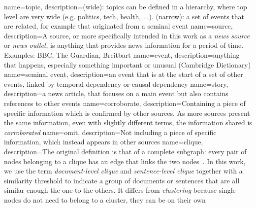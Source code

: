 {
        name=topic,
        description={(wide): topics can be defined in a hierarchy, where top level are very wide (e.g. politics, tech, health, ...).
        (narrow): a set of events that are related, for example that originated from a seminal event}
}
{
        name=source,
        description={A source, or more specifically intended in this work as a \emph{news source} or \emph{news outlet}, is anything that provides news information for a period of time. Examples: BBC, The Guardian, Breitbart}
}
{
        name=event,
        description={anything that happens, especially something important or unusual (Cambridge Dictionary)}
}
{
        name=seminal event,
        description={an event that is at the start of a set of other events, linked by temporal dependency or causal dependency}
}
{
        name=story,
        description={a news article, that focuses on a main event but also contains references to other events}
}
{
        name=corroborate,
        description={Containing a piece of specific information which is confirmed by other sources. As more sources present the same information, even with slightly different terms, the information shared is \emph{corroborated}}
}
{
        name=omit,
        description={Not including a piece of specific information, which instead appears in other sources}
}
{
        name=clique,
        description={The original definition is that of a complete subgraph: every pair of nodes belonging to a clique has an edge that links the two nodes~\citep{luce1949method}. In this work, we use the term \emph{document-level clique} and \emph{sentence-level clique} together with a similarity threshold to indicate a group of documents or sentences that are all similar enough the one to the others. It differs from \emph{clustering} because single nodes do not need to belong to a cluster, they can be on their own}
}
